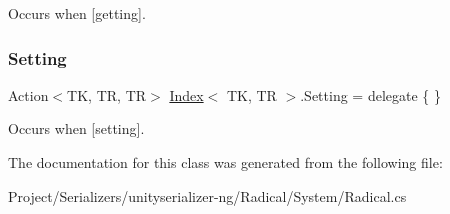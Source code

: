 Occurs when \mbox{[}getting\mbox{]}. 

\mbox{\label{class_index_aa53b2a997b85088499bc11af6ca6ddfc}} 
\subsubsection{\texorpdfstring{Setting}{Setting}}
{\footnotesize\ttfamily Action$<$TK, TR, TR$>$ \hyperlink{class_index}{Index}$<$ TK, TR $>$.Setting = delegate \{ \}}



Occurs when \mbox{[}setting\mbox{]}. 



The documentation for this class was generated from the following file\+:\begin{DoxyCompactItemize}
\item 
Project/\+Serializers/unityserializer-\/ng/\+Radical/\+System/Radical.\+cs\end{DoxyCompactItemize}
